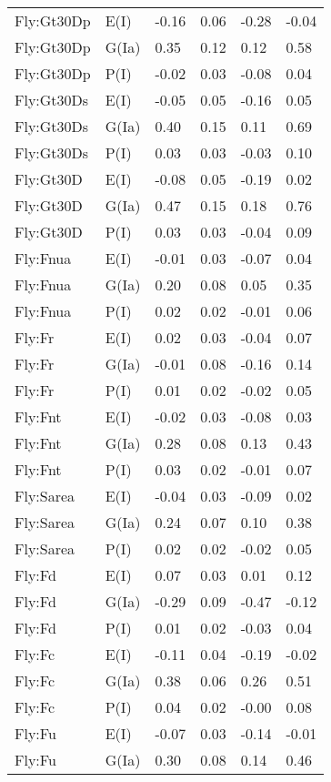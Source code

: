 \begin{center}
\begin{longtable}{|p{1.1in}|p{0.7in}|p{0.7in}|p{0.6in}|p{0.6in}|p{0.6in}|}
  Fly:Gt30Dp & E(I) & -0.16 & 0.06 & -0.28 & -0.04 \\ 
  Fly:Gt30Dp & G(Ia) & 0.35 & 0.12 & 0.12 & 0.58 \\ 
  Fly:Gt30Dp & P(I) & -0.02 & 0.03 & -0.08 & 0.04 \\ 
  Fly:Gt30Ds & E(I) & -0.05 & 0.05 & -0.16 & 0.05 \\ 
  Fly:Gt30Ds & G(Ia) & 0.40 & 0.15 & 0.11 & 0.69 \\ 
  Fly:Gt30Ds & P(I) & 0.03 & 0.03 & -0.03 & 0.10 \\ 
  Fly:Gt30D & E(I) & -0.08 & 0.05 & -0.19 & 0.02 \\ 
  Fly:Gt30D & G(Ia) & 0.47 & 0.15 & 0.18 & 0.76 \\ 
  Fly:Gt30D & P(I) & 0.03 & 0.03 & -0.04 & 0.09 \\ 
  Fly:Fnua & E(I) & -0.01 & 0.03 & -0.07 & 0.04 \\ 
  Fly:Fnua & G(Ia) & 0.20 & 0.08 & 0.05 & 0.35 \\ 
  Fly:Fnua & P(I) & 0.02 & 0.02 & -0.01 & 0.06 \\ 
  Fly:Fr & E(I) & 0.02 & 0.03 & -0.04 & 0.07 \\ 
  Fly:Fr & G(Ia) & -0.01 & 0.08 & -0.16 & 0.14 \\ 
  Fly:Fr & P(I) & 0.01 & 0.02 & -0.02 & 0.05 \\ 
  Fly:Fnt & E(I) & -0.02 & 0.03 & -0.08 & 0.03 \\ 
  Fly:Fnt & G(Ia) & 0.28 & 0.08 & 0.13 & 0.43 \\ 
  Fly:Fnt & P(I) & 0.03 & 0.02 & -0.01 & 0.07 \\ 
  Fly:Sarea & E(I) & -0.04 & 0.03 & -0.09 & 0.02 \\ 
  Fly:Sarea & G(Ia) & 0.24 & 0.07 & 0.10 & 0.38 \\ 
  Fly:Sarea & P(I) & 0.02 & 0.02 & -0.02 & 0.05 \\ 
  Fly:Fd & E(I) & 0.07 & 0.03 & 0.01 & 0.12 \\ 
  Fly:Fd & G(Ia) & -0.29 & 0.09 & -0.47 & -0.12 \\ 
  Fly:Fd & P(I) & 0.01 & 0.02 & -0.03 & 0.04 \\ 
  Fly:Fc & E(I) & -0.11 & 0.04 & -0.19 & -0.02 \\ 
  Fly:Fc & G(Ia) & 0.38 & 0.06 & 0.26 & 0.51 \\ 
  Fly:Fc & P(I) & 0.04 & 0.02 & -0.00 & 0.08 \\ 
  Fly:Fu & E(I) & -0.07 & 0.03 & -0.14 & -0.01 \\ 
  Fly:Fu & G(Ia) & 0.30 & 0.08 & 0.14 & 0.46 \\ 

\end{longtable}
\end{center}
